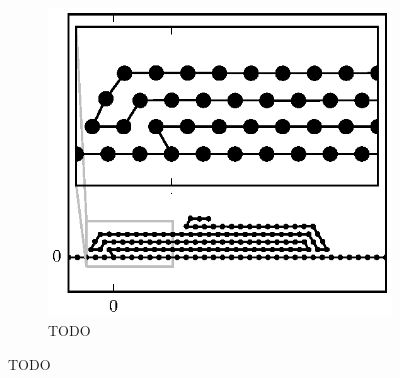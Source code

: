 \begin{figure}
		\begin{subfigure}{.5\textwidth}
			\centering
			\includegraphics{./fig/ch3/fs/b0.5_eb10.eps}
			\caption{TODO \label{subfig:fs_manyfold}}
		\end{subfigure}		
		\caption{TODO\label{fig:fs_folds}}	
	\end{figure}
	
